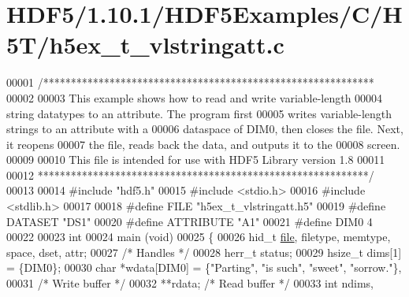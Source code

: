 \hypertarget{_h_d_f5_21_810_81_2_h_d_f5_examples_2_c_2_h5_t_2h5ex__t__vlstringatt_8c_source}{}\section{H\+D\+F5/1.10.1/\+H\+D\+F5\+Examples/\+C/\+H5\+T/h5ex\+\_\+t\+\_\+vlstringatt.c}
\label{_h_d_f5_21_810_81_2_h_d_f5_examples_2_c_2_h5_t_2h5ex__t__vlstringatt_8c_source}

\begin{DoxyCode}
00001 \textcolor{comment}{/************************************************************}
00002 \textcolor{comment}{}
00003 \textcolor{comment}{  This example shows how to read and write variable-length}
00004 \textcolor{comment}{  string datatypes to an attribute.  The program first}
00005 \textcolor{comment}{  writes variable-length strings to an attribute with a}
00006 \textcolor{comment}{  dataspace of DIM0, then closes the file.  Next, it reopens}
00007 \textcolor{comment}{  the file, reads back the data, and outputs it to the}
00008 \textcolor{comment}{  screen.}
00009 \textcolor{comment}{}
00010 \textcolor{comment}{  This file is intended for use with HDF5 Library version 1.8}
00011 \textcolor{comment}{}
00012 \textcolor{comment}{ ************************************************************/}
00013 
00014 \textcolor{preprocessor}{#include "hdf5.h"}
00015 \textcolor{preprocessor}{#include <stdio.h>}
00016 \textcolor{preprocessor}{#include <stdlib.h>}
00017 
00018 \textcolor{preprocessor}{#define FILE            "h5ex\_t\_vlstringatt.h5"}
00019 \textcolor{preprocessor}{#define DATASET         "DS1"}
00020 \textcolor{preprocessor}{#define ATTRIBUTE       "A1"}
00021 \textcolor{preprocessor}{#define DIM0            4}
00022 
00023 \textcolor{keywordtype}{int}
00024 main (\textcolor{keywordtype}{void})
00025 \{
00026     hid\_t       \hyperlink{structfile}{file}, filetype, memtype, space, dset, attr;
00027                                             \textcolor{comment}{/* Handles */}
00028     herr\_t      status;
00029     hsize\_t     dims[1] = \{DIM0\};
00030     \textcolor{keywordtype}{char}        *wdata[DIM0] = \{\textcolor{stringliteral}{"Parting"}, \textcolor{stringliteral}{"is such"}, \textcolor{stringliteral}{"sweet"}, \textcolor{stringliteral}{"sorrow."}\},
00031                                             \textcolor{comment}{/* Write buffer */}
00032                 **rdata;                    \textcolor{comment}{/* Read buffer */}
00033     \textcolor{keywordtype}{int}         ndims,

\end{DoxyCode}
